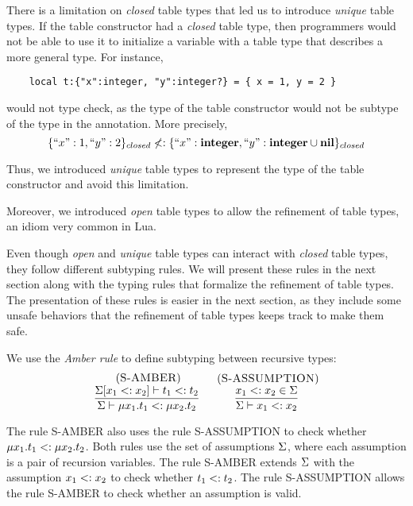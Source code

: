 There is a limitation on \emph{closed} table types that led us to
introduce \emph{unique} table types.
If the table constructor had a \emph{closed} table type, then
programmers would not be able to use it to initialize a variable with
a table type that describes a more general type.
For instance,
\begin{verbatim}
    local t:{"x":integer, "y":integer?} = { x = 1, y = 2 }
\end{verbatim}
would not type check, as the type of the table constructor would not
be subtype of the type in the annotation.
More precisely,
\[
\{``x":1, ``y":2\}_{closed} \not<: \{``x":\mathbf{integer}, ``y":\mathbf{integer} \cup \mathbf{nil}\}_{closed}
\]

Thus, we introduced \emph{unique} table types to represent the type of
the table constructor and avoid this limitation.

Moreover, we introduced \emph{open} table types to allow the refinement of table types,
an idiom very common in Lua.

Even though \emph{open} and \emph{unique} table types can interact with
\emph{closed} table types, they follow different subtyping rules.
We will present these rules in the next section along with the typing
rules that formalize the refinement of table types.
The presentation of these rules is easier in the next section,
as they include some unsafe behaviors that the refinement of
table types keeps track to make them safe.

We use the \emph{Amber rule} \citep{cardelli1986amber} to define
subtyping between recursive types:
\[
\begin{array}{c}
\begin{array}{c}
\; (\textsc{S-AMBER})\\
\dfrac{\Sigma[x_{1} <: x_{2}] \vdash t_{1} <: t_{2}}
      {\Sigma \vdash \mu x_{1}.t_{1} <: \mu x_{2}.t_{2}}
\end{array}
\;
\begin{array}{c}
\; (\textsc{S-ASSUMPTION})\\
\dfrac{x_{1} <: x_{2} \in \Sigma}
      {\Sigma \vdash x_{1} <: x_{2}}
\end{array}
\end{array}
\]

The rule \textsc{S-AMBER} also uses the rule \textsc{S-ASSUMPTION}
to check whether $\mu x_{1}.t_{1} <: \mu x_{2}.t_{2}$.
Both rules use the set of assumptions $\Sigma$,
where each assumption is a pair of recursion variables.
The rule \textsc{S-AMBER} extends $\Sigma$ with the assumption
$x_{1} <: x_{2}$ to check whether $t_{1} <: t_{2}$.
The rule \textsc{S-ASSUMPTION} allows the rule \textsc{S-AMBER}
to check whether an assumption is valid.

